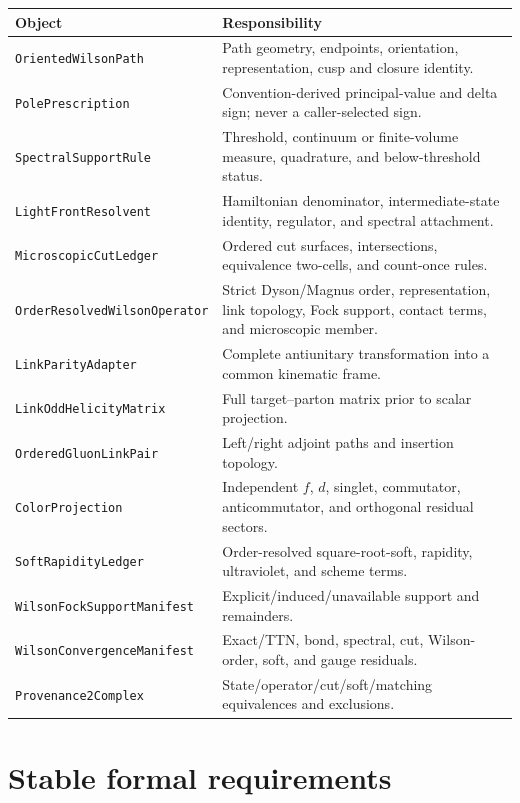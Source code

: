 \documentclass[11pt]{article}
\newcommand{\WilsonOperator}{\texttt{OrderResolvedWilsonOperator}}
\newcommand{\SpectralRule}{\texttt{SpectralSupportRule}}
\newcommand{\CutLedger}{\texttt{MicroscopicCutLedger}}
\newcommand{\SoftLedger}{\texttt{SoftRapidityLedger}}
\newcommand{\WilsonManifest}{\texttt{WilsonFockSupportManifest}}
\newcommand{\ConvergenceManifest}{\texttt{WilsonConvergenceManifest}}
\newcommand{\ProvComplex}{\texttt{Provenance2Complex}}
\begin{document}
\begin{longtable}{L{0.32\textwidth}L{0.58\textwidth}}
\toprule
Object & Responsibility\\
\midrule
\endhead
\texttt{OrientedWilsonPath} & Path geometry, endpoints, orientation,
representation, cusp and closure identity.\\
\texttt{PolePrescription} & Convention-derived principal-value and delta
sign; never a caller-selected sign.\\
\SpectralRule & Threshold, continuum or finite-volume measure, quadrature,
and below-threshold status.\\
\texttt{LightFrontResolvent} & Hamiltonian denominator, intermediate-state
identity, regulator, and spectral attachment.\\
\CutLedger & Ordered cut surfaces, intersections, equivalence two-cells, and
count-once rules.\\
\WilsonOperator & Strict Dyson/Magnus order, representation, link topology,
Fock support, contact terms, and microscopic member.\\
\texttt{LinkParityAdapter} & Complete antiunitary transformation into a common
kinematic frame.\\
\texttt{LinkOddHelicityMatrix} & Full target--parton matrix prior to scalar
projection.\\
\texttt{OrderedGluonLinkPair} & Left/right adjoint paths and insertion
topology.\\
\texttt{ColorProjection} & Independent \(f\), \(d\), singlet, commutator,
anticommutator, and orthogonal residual sectors.\\
\SoftLedger & Order-resolved square-root-soft, rapidity, ultraviolet, and
scheme terms.\\
\WilsonManifest & Explicit/induced/unavailable support and remainders.\\
\ConvergenceManifest & Exact/TTN, bond, spectral, cut, Wilson-order, soft,
and gauge residuals.\\
\ProvComplex & State/operator/cut/soft/matching equivalences and exclusions.\\
\bottomrule
\end{longtable}

\section{Stable formal requirements}
\label{sec:requirements}
\end{document}
